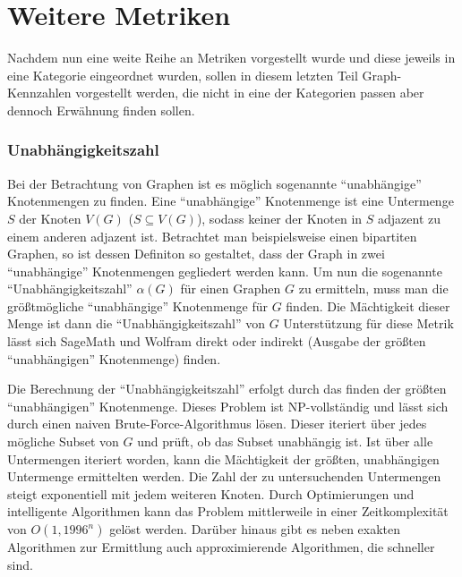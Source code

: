 \documentclass[a4paper,12pt,ngerman,chapterprefix=false,listof=totoc,bibliography=totoc]{scrreprt}
\begin{document}
\section{Weitere Metriken}
{
Nachdem nun eine weite Reihe an Metriken vorgestellt wurde und diese jeweils in eine Kategorie eingeordnet wurden, sollen in diesem letzten Teil Graph-Kennzahlen vorgestellt werden, die nicht in eine der Kategorien passen aber dennoch Erwähnung finden sollen.
\subsubsection*{Unabhängigkeitszahl}
{
Bei der Betrachtung von Graphen ist es möglich sogenannte "`unabhängige"' Knotenmengen zu finden. Eine "`unabhängige"' Knotenmenge ist eine Untermenge \(S\) der Knoten \(V(G)\) (\(S\subseteq V(G)\)), sodass keiner der Knoten in \(S\) adjazent zu einem anderen adjazent ist. Betrachtet man beispielsweise einen bipartiten Graphen, so ist dessen Definiton so gestaltet, dass der Graph in zwei "`unabhängige"' Knotenmengen gegliedert werden kann. Um nun die sogenannte "`Unabhängigkeitszahl"' \(\alpha(G)\) für einen Graphen \(G\) zu ermitteln, muss man die größtmögliche "`unabhängige"' Knotenmenge für \(G\) finden. Die Mächtigkeit dieser Menge ist dann die "`Unabhängigkeitszahl"' von \(G\) \cite{diestel_graphentheorie_2000,weisstein_maximum_nodate,weisstein_maximum_nodate} Unterstützung für diese Metrik lässt sich SageMath und Wolfram direkt oder indirekt (Ausgabe der größten "`unabhängigen"' Knotenmenge) finden. \cite{sagemath_graph_2020,weisstein_independence_nodate}

Die Berechnung der "`Unabhängigkeitszahl"' erfolgt durch das finden der größten "`unabhängigen"' Knotenmenge. Dieses Problem ist NP-vollständig und lässt sich durch einen naiven Brute-Force-Algorithmus lösen. Dieser iteriert über jedes mögliche Subset von \(G\) und prüft, ob das Subset unabhängig ist. Ist über alle Untermengen iteriert worden, kann die Mächtigkeit der größten, unabhängigen Untermenge ermittelten werden. Die Zahl der zu untersuchenden Untermengen steigt exponentiell mit jedem weiteren Knoten. Durch Optimierungen und intelligente Algorithmen kann das Problem mittlerweile in einer Zeitkomplexität von \(O(1,1996^n)\) gelöst werden. Darüber hinaus gibt es neben exakten Algorithmen zur Ermittlung auch approximierende Algorithmen, die schneller sind. \cite{xiao_exact_2017}
}
}
\end{document}
